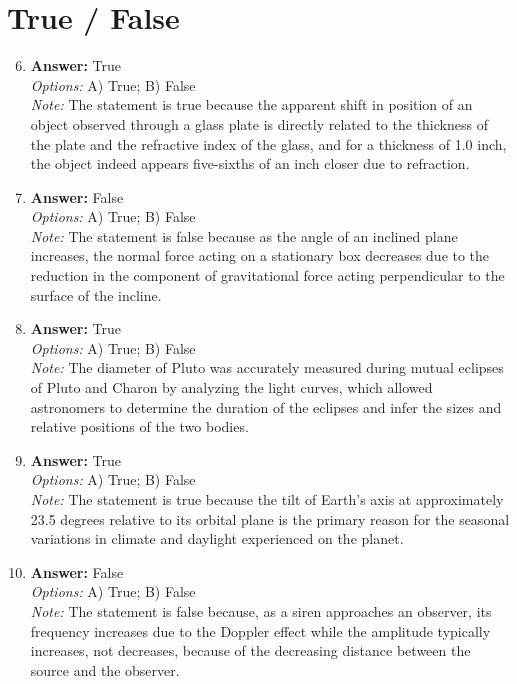 \documentclass[12pt]{article}
\begin{document}
\section*{True / False}
\begin{enumerate}[label=\arabic*.]
\setcounter{enumi}{5}
\item \textbf{Answer:} True
\\ \textit{Options:} A) True; B) False
\\ \textit{Note:} The statement is true because the apparent shift in position of an object observed through a glass plate is directly related to the thickness of the plate and the refractive index of the glass, and for a thickness of 1.0 inch, the object indeed appears five-sixths of an inch closer due to refraction.
\item \textbf{Answer:} False
\\ \textit{Options:} A) True; B) False
\\ \textit{Note:} The statement is false because as the angle of an inclined plane increases, the normal force acting on a stationary box decreases due to the reduction in the component of gravitational force acting perpendicular to the surface of the incline.
\item \textbf{Answer:} True
\\ \textit{Options:} A) True; B) False
\\ \textit{Note:} The diameter of Pluto was accurately measured during mutual eclipses of Pluto and Charon by analyzing the light curves, which allowed astronomers to determine the duration of the eclipses and infer the sizes and relative positions of the two bodies.
\item \textbf{Answer:} True
\\ \textit{Options:} A) True; B) False
\\ \textit{Note:} The statement is true because the tilt of Earth's axis at approximately 23.5 degrees relative to its orbital plane is the primary reason for the seasonal variations in climate and daylight experienced on the planet.
\item \textbf{Answer:} False
\\ \textit{Options:} A) True; B) False
\\ \textit{Note:} The statement is false because, as a siren approaches an observer, its frequency increases due to the Doppler effect while the amplitude typically increases, not decreases, because of the decreasing distance between the source and the observer.
\end{enumerate}
\end{document}
